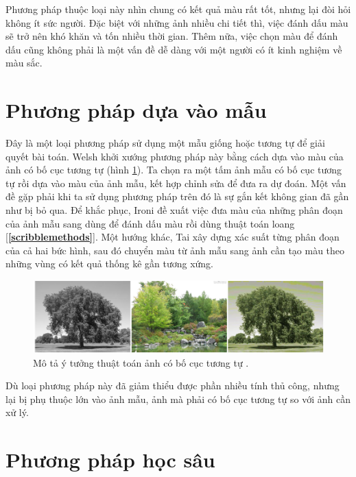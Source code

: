 \documentclass[a4paper, 12pt]{report}
\begin{document}
Phương pháp thuộc loại này nhìn chung có kết quả màu rất tốt, nhưng lại đòi hỏi không ít sức người.
Đặc biệt với những ảnh nhiều chi tiết thì, việc đánh dấu màu sẽ trở nên khó khăn và tốn nhiều thời gian.
Thêm nữa, việc chọn màu để đánh dấu cũng không phải là một vấn đề dễ dàng với một người có ít kinh nghiệm về màu sắc.

\section{Phương pháp dựa vào mẫu}\label{examplarmethods}

Đây là một loại phương pháp sử dụng một mẫu giống hoặc tương tự để giải quyết bài toán.
Welsh \cite{welshcolorization} khởi xướng phương pháp này bằng cách dựa vào màu của ảnh có bố cục tương tự (hình \ref{fig:examplarmethod}).
Ta chọn ra một tấm ảnh mẫu có bố cục tương tự rồi dựa vào màu của ảnh mẫu, kết hợp chỉnh sửa để đưa ra dự đoán.
Một vấn đề gặp phải khi ta sử dụng phương pháp trên đó là sự gắn kết không gian đã gần như bị bỏ qua.
Để khắc phục, Ironi \cite{ironicolorization} đề xuất việc đưa màu của những phân đoạn của ảnh mẫu sang dùng để đánh dấu màu rồi dùng thuật toán loang [\textbf{\ref{scribblemethods}}].
Một hướng khác, Tai \cite{taicolorization} xây dựng xác suất từng phân đoạn của cả hai bức hình, sau đó chuyển màu từ ảnh mẫu sang ảnh cần tạo màu theo những vùng có kết quả thống kê gần tương xứng.

\begin{figure}[!h]
\captionsetup{width=0.8\textwidth}
\centering
\includegraphics[width=15cm]{images/2_5.png}
\caption{Mô tả ý tưởng thuật toán ảnh có bố cục tương tự \cite{trungcolorization2018}.}
\label{fig:examplarmethod}
\end{figure}


Dù loại phương pháp này đã giảm thiểu được phần nhiều tính thủ công, nhưng lại bị phụ thuộc lớn vào ảnh mẫu, ảnh mà phải có bố cục tương tự so với ảnh cần xử lý.

\section{Phương pháp học sâu}\label{deeplearningmethods}
\end{document}
